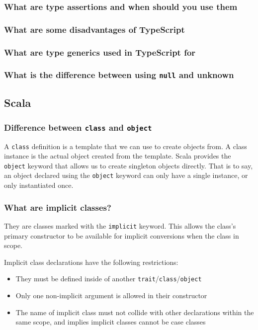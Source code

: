 \documentclass[12pt, a4paper]{article}
\newcommand{\code}[1]{\texttt{#1}}
\begin{document}
\subsubsection*{What are type assertions and when should you use them}

\subsubsection*{What are some disadvantages of TypeScript}

\subsubsection*{What are type generics used in TypeScript for}

\subsubsection*{What is the difference between using \code{null} and {unknown}}

\pagebreak

\subsection*{Scala}

\subsubsection*{Difference between \code{class} and \code{object}}
A \code{class} definition is a template that we can use to create objects from.
A class instance is the actual object created from the template.
Scala provides the \code{object} keyword that allows us to create singleton objects directly.
That is to say, an object declared using the \code{object} keyword can only have a single instance, or only instantiated once.

\subsubsection*{What are implicit classes?}
They are classes marked with the \code{implicit} keyword.
This allows the class's primary constructor to be available for implicit conversions when the class in scope.\newline

Implicit class declarations have the following restrictions:
\begin{itemize}
  \item They must be defined inside of another \code{trait}/\code{class}/\code{object}
  \item Only one non-implicit argument is allowed in their constructor
  \item The name of implicit class must not collide with other declarations within the same scope, and implies implicit classes cannot be case classes
\end{itemize}
\end{document}
